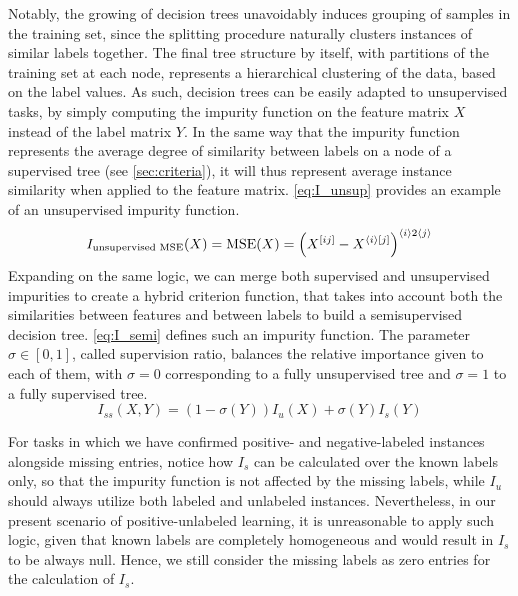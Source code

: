 
Notably, the growing of decision trees unavoidably induces grouping of samples in the training set, since the splitting procedure naturally clusters instances of similar labels together. The final tree structure by itself, with partitions of the training set at each node, represents a hierarchical clustering of the data, based on the label values. As such, decision trees can be easily adapted to unsupervised tasks, by simply computing the impurity function on the feature matrix $X$ instead of the label matrix $Y$. In the same way that the impurity function represents the average degree of similarity between labels on a node of a supervised tree (see \autoref{sec:criteria}), it will thus represent average instance similarity when applied to the feature matrix. \autoref{eq:I_unsup} provides an example of an unsupervised impurity function.
%
\begin{equation}
    I_\text{unsupervised MSE}(X) = \text{MSE}(X) = \left( X^{[ij]} - X^{\langle i\rangle[j]} \right)^{\langle i\rangle2\langle j\rangle}
    \label{eq:I_unsup}
\end{equation}
%
Expanding on the same logic, we can merge both supervised and unsupervised impurities to create a hybrid criterion function, that takes into account both the similarities between features and between labels to build a semisupervised decision tree. \autoref{eq:I_semi} defines such an impurity function. The parameter $\sigma \in [0, 1]$, called supervision ratio,%
balances the relative importance given to each of them, with $\sigma = 0$ corresponding to a fully unsupervised tree and $\sigma = 1$ to a fully supervised tree.
%
\begin{equation}
    I_{ss}(X, Y) = (1 - \sigma(Y)) I_u(X) + \sigma(Y) I_s(Y)
    \label{eq:I_semi}
\end{equation}

For tasks in which we have confirmed positive- and negative-labeled instances alongside missing entries, notice how $I_s$ can be calculated over the known labels only, so that the impurity function is not affected by the missing labels, while $I_u$ should always utilize both labeled and unlabeled instances. Nevertheless, in our present scenario of positive-unlabeled learning, it is unreasonable to apply such logic, given that known labels are completely homogeneous and would result in $I_s$ to be always null. Hence, we still consider the missing labels as zero entries for the calculation of $I_s$.

